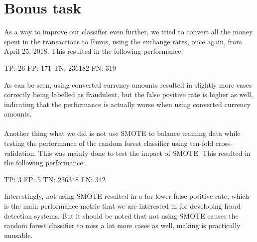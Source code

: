 \documentclass[]{article}
\begin{document}
\section{Bonus task}
As a way to improve our classifier even further, we tried to convert all the money spent in the transactions to Euros, using the exchange rates, once again, from April 25, 2018. This resulted in the following performance:
\begin{flushleft}
	TP: 26 \newline
	FP: 171  \newline
	TN: 236182 \newline
	FN: 319 \newline
\end{flushleft}
As can be seen, using converted currency amounts resulted in slightly more cases correctly being labelled as fraudulent, but the false positive rate is higher as well, indicating that the performance is actually worse when using converted currency amounts.\\
\\
Another thing what we did is not use SMOTE to balance training data while testing the performance of the random forest classifier using ten-fold cross-validation. This was mainly done to test the impact of SMOTE. This resulted in the following performance:
\begin{flushleft}
	TP: 3 \newline
	FP: 5  \newline
	TN: 236348 \newline
	FN: 342 \newline
\end{flushleft}
Interestingly, not using SMOTE resulted in a far lower false positive rate, which is the main performance metric that we are interested in for developing fraud detection systems. But it should be noted that not using SMOTE causes the random forest classifier to miss a lot more cases as well, making is practically unusable. 


\end{document}
